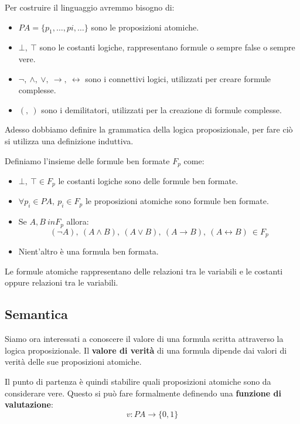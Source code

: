 Per costruire il linguaggio avremmo bisogno di:
\begin{itemize}
    \item $PA = \{p_1, \dots, pi, \dots\}$ sono le proposizioni atomiche.
    \item $\bot, \ \top$ sono le costanti logiche, rappresentano formule o sempre
          false o sempre vere.
    \item $\lnot, \ \land, \ \lor, \ \to, \ \leftrightarrow$ sono i connettivi
          logici, utilizzati per creare formule complesse.
    \item $(, \ )$ sono i demilitatori, utilizzati per la creazione di formule
          complesse.
\end{itemize}
Adesso dobbiamo definire la grammatica della logica proposizionale, per fare ciò
si utilizza una definizione induttiva.
\begin{definizione}
    Definiamo l'insieme delle formule ben formate $F_p$ come:
    \begin{itemize}
        \item $\bot, \ \top \in F_p$ le costanti logiche sono delle formule ben
              formate.
        \item $\forall p_i \in PA, \ p_i \in F_p$ le proposizioni atomiche sono
              formule ben formate.
        \item Se $A, B \ in F_p$ allora:
              \begin{equation}
                  (\lnot A), \ (A \land B), \ (A \lor B), \ (A \to B), \ (A \leftrightarrow B) \ \in F_p
              \end{equation}
        \item Nient'altro è una formula ben formata.
    \end{itemize}
\end{definizione}
Le formule atomiche rappresentano delle relazioni tra le variabili e le costanti
oppure relazioni tra le variabili.
\subsection{Semantica}
Siamo ora interessati a conoscere il valore di una formula scritta attraverso la
logica proposizionale. Il \textbf{valore di verità} di una formula dipende dai
valori di verità delle sue proposizioni atomiche.

Il punto di partenza è quindi stabilire quali proposizioni atomiche sono da
considerare vere. Questo si può fare formalmente definendo una \textbf{funzione di valutazione}:
\begin{equation}
    v: PA \to \{0, 1\}
\end{equation}

